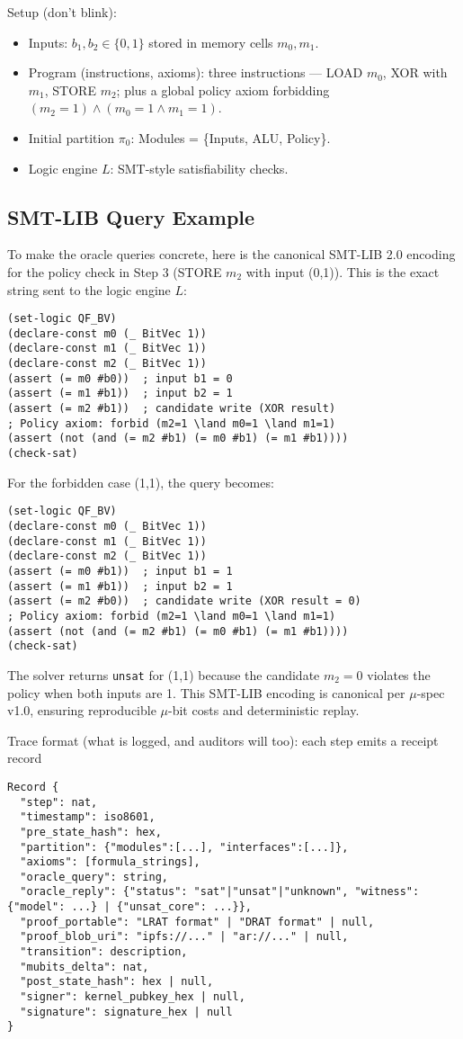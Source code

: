 \documentclass[11pt]{article}
\begin{document}
Setup (don’t blink):
\begin{itemize}
  \item Inputs: $b_1, b_2 \in \{0,1\}$ stored in memory cells $m_0, m_1$.
  \item Program (instructions, axioms): three instructions — LOAD $m_0$, XOR with $m_1$, STORE $m_2$; plus a global policy axiom forbidding $(m_2 = 1) \land (m_0 = 1 \land m_1 = 1)$.
  \item Initial partition $\pi_0$: Modules = \{Inputs, ALU, Policy\}.
  \item Logic engine $L$: SMT-style satisfiability checks.
\end{itemize}

\subsection{SMT-LIB Query Example}
To make the oracle queries concrete, here is the canonical SMT-LIB 2.0 encoding for the policy check in Step 3 (STORE $m_2$ with input (0,1)). This is the exact string sent to the logic engine $L$:

\begin{verbatim}
(set-logic QF_BV)
(declare-const m0 (_ BitVec 1))
(declare-const m1 (_ BitVec 1))
(declare-const m2 (_ BitVec 1))
(assert (= m0 #b0))  ; input b1 = 0
(assert (= m1 #b1))  ; input b2 = 1
(assert (= m2 #b1))  ; candidate write (XOR result)
; Policy axiom: forbid (m2=1 \land m0=1 \land m1=1)
(assert (not (and (= m2 #b1) (= m0 #b1) (= m1 #b1))))
(check-sat)
\end{verbatim}

For the forbidden case (1,1), the query becomes:
\begin{verbatim}
(set-logic QF_BV)
(declare-const m0 (_ BitVec 1))
(declare-const m1 (_ BitVec 1))
(declare-const m2 (_ BitVec 1))
(assert (= m0 #b1))  ; input b1 = 1
(assert (= m1 #b1))  ; input b2 = 1
(assert (= m2 #b0))  ; candidate write (XOR result = 0)
; Policy axiom: forbid (m2=1 \land m0=1 \land m1=1)
(assert (not (and (= m2 #b1) (= m0 #b1) (= m1 #b1))))
(check-sat)
\end{verbatim}

The solver returns \texttt{unsat} for (1,1) because the candidate $m_2 = 0$ violates the policy when both inputs are 1. This SMT-LIB encoding is canonical per $\mu$-spec v1.0, ensuring reproducible $\mu$-bit costs and deterministic replay.

Trace format (what is logged, and auditors will too): each step emits a receipt record
\begin{verbatim}
Record {
  "step": nat,
  "timestamp": iso8601,
  "pre_state_hash": hex,
  "partition": {"modules":[...], "interfaces":[...]},
  "axioms": [formula_strings],
  "oracle_query": string,
  "oracle_reply": {"status": "sat"|"unsat"|"unknown", "witness": {"model": ...} | {"unsat_core": ...}},
  "proof_portable": "LRAT format" | "DRAT format" | null,
  "proof_blob_uri": "ipfs://..." | "ar://..." | null,
  "transition": description,
  "mubits_delta": nat,
  "post_state_hash": hex | null,
  "signer": kernel_pubkey_hex | null,
  "signature": signature_hex | null
}
\end{verbatim}
\end{document}
